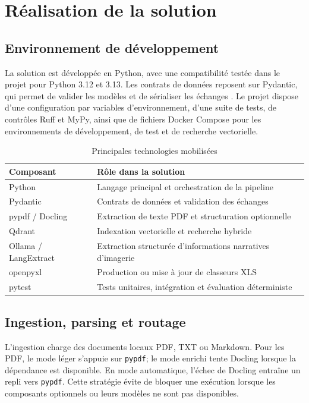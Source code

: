 \chapter{Réalisation de la solution}
\section{Environnement de développement}
La solution est développée en Python, avec une compatibilité testée dans le projet pour Python 3.12 et 3.13. Les contrats de données reposent sur Pydantic, qui permet de valider les modèles et de sérialiser les échanges \cite{pydantic}. Le projet dispose d'une configuration par variables d'environnement, d'une suite de tests, de contrôles Ruff et MyPy, ainsi que de fichiers Docker Compose pour les environnements de développement, de test et de recherche vectorielle.

\begin{table}[H]
\centering
\caption{Principales technologies mobilisées}
\begin{tabularx}{\textwidth}{lX}
\toprule
Composant & Rôle dans la solution\\
\midrule
Python & Langage principal et orchestration de la pipeline\\
Pydantic & Contrats de données et validation des échanges\\
pypdf / Docling & Extraction de texte PDF et structuration optionnelle\\
Qdrant & Indexation vectorielle et recherche hybride\\
Ollama / LangExtract & Extraction structurée d'informations narratives d'imagerie\\
openpyxl & Production ou mise à jour de classeurs XLS\\
pytest & Tests unitaires, intégration et évaluation déterministe\\
\bottomrule
\end{tabularx}
\end{table}

\section{Ingestion, parsing et routage}
L'ingestion charge des documents locaux PDF, TXT ou Markdown. Pour les PDF, le mode léger s'appuie sur \texttt{pypdf}; le mode enrichi tente Docling lorsque la dépendance est disponible. En mode automatique, l'échec de Docling entraîne un repli vers \texttt{pypdf}. Cette stratégie évite de bloquer une exécution lorsque les composants optionnels ou leurs modèles ne sont pas disponibles.

